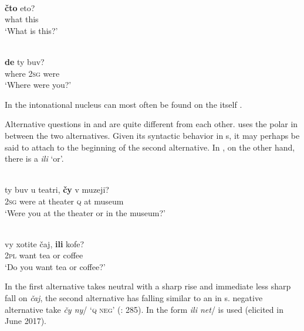 \ea%
    \label{ex:indo:19}
    \\
    \gll \textbf{{čto}} eto?\\
    what  this\\
    \glt ‘What is this?’ \citep[23]{Comrie1984}
    \z

\ea%
    \label{ex:indo:20}
    \\
    \gll \textbf{{de}} ty buv?\\
    where  2\textsc{sg}  were\\
    \glt ‘Where were you?’ \citep[979]{Shevelov1993}
    \z

\noindent In  the intonational nucleus can most often be found on the  itself \citep[24]{Comrie1984}.

Alternative questions in  and  are quite different from each other.  uses the polar  in between the two alternatives. Given its syntactic behavior in s, it may perhaps be said to attach to the beginning of the second alternative. In , on the other hand, there is a  \textit{ili} ‘or’.

\ea%
    \label{ex:indo:21}
    \\
    \gll ty buv u teatri, \textbf{{čy}} v muzej{i?}\\
    2\textsc{sg}  were  at  theater    \textsc{q}  at  museum\\
    \glt ‘Were you at the theater or in the museum?’ \citep[978]{Shevelov1993}
    \z

\ea%
    \label{ex:indo:22}
    \\
    \gll vy  xotite  čaj, \textbf{{ili}} kofe?\\
    2\textsc{pl}  want  tea    or  coffee\\
    \glt ‘Do you want tea or coffee?’ \citep[23]{Comrie1984}
    \z

\noindent In  the first alternative takes neutral   with a sharp rise and immediate less sharp fall on \textit{čaj}, the second alternative has falling  similar to an  in s.  negative alternative  take \textit{čy ny}/ ‘\textsc{q} \textsc{neg}’ (\citealt{PughPress1999}: 285). In  the form \textit{ili net}/ is used (elicited in June 2017).

